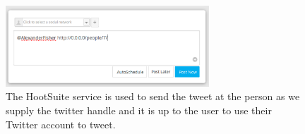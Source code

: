 \documentclass[draftclsnofoot,10pt,onecolumn]{IEEEtran} %
\begin{document}
\begin{enumerate}[label*=\arabic*.]
\begin{figure}[H]
\begin{center}
  \end{center}
\end{figure}

\begin{figure}[H]
  \begin{center}
  
  \includegraphics[width=3in, frame]{tweet_person2}
  	\captionsetup{width=.4\linewidth}
  \centering
  \caption{The HootSuite service is used to send the tweet at the person as we supply the twitter handle and it is up to the user to use their Twitter account to tweet.}

  \end{center}
\end{figure}

\end{enumerate}
\end{document}
